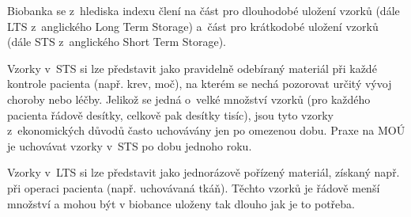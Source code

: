 \documentclass[11pt,draft,oneside]{fithesis2}
\begin{document}
Biobanka se z~hlediska indexu člení na část pro dlouhodobé uložení vzorků (dále LTS z~anglického Long Term Storage) a~část pro krátkodobé uložení vzorků (dále STS z~anglického Short Term Storage). 

Vzorky v~STS si lze představit jako pravidelně odebíraný materiál při každé kontrole pacienta (např. krev, moč), na kterém se nechá pozorovat určitý vývoj choroby nebo léčby. Jelikož se jedná o~velké množství vzorků (pro každého pacienta řádově desítky, celkově pak desítky tisíc), jsou tyto vzorky z~ekonomických důvodů často uchovávány jen po omezenou dobu. Praxe na MOÚ je uchovávat vzorky v~STS po dobu jednoho roku.

Vzorky v~LTS si lze představit jako jednorázově pořízený materiál, získaný např. při operaci pacienta (např. uchovávaná tkáň). 
Těchto vzorků je řádově menší množství a mohou být v biobance uloženy tak dlouho jak je to potřeba.
\end{document}
